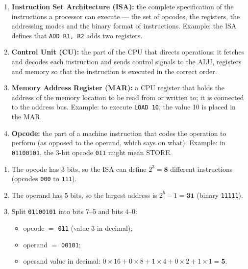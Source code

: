 \documentclass[11pt]{article}
\begin{document}
\begin{corrige}
\begin{enumerate}
\item \textbf{Instruction Set Architecture (ISA):} the complete specification of the instructions a processor can execute — the set of opcodes, the registers, the addressing modes and the binary format of instructions. Example: the ISA defines that \texttt{ADD R1, R2} adds two registers.
\item \textbf{Control Unit (CU):} the part of the CPU that directs operations: it fetches and decodes each instruction and sends control signals to the ALU, registers and memory so that the instruction is executed in the correct order.
\item \textbf{Memory Address Register (MAR):} a CPU register that holds the address of the memory location to be read from or written to; it is connected to the address bus. Example: to execute \texttt{LOAD 10}, the value 10 is placed in the MAR.
\item \textbf{Opcode:} the part of a machine instruction that codes the operation to perform (as opposed to the operand, which says on what). Example: in \texttt{01100101}, the 3-bit opcode \texttt{011} might mean STORE.
\end{enumerate}
\end{corrige}

\begin{corrige}
\begin{enumerate}
\item The opcode has 3 bits, so the ISA can define $2^3 = \textbf{8}$ different instructions (opcodes \texttt{000} to \texttt{111}).
\item The operand has 5 bits, so the largest address is $2^5 - 1 = \textbf{31}$ (binary \texttt{11111}).
\item Split \texttt{01100101} into bits 7--5 and bits 4--0:
\begin{itemize}
\item opcode $=$ \texttt{011} (value 3 in decimal);
\item operand $=$ \texttt{00101};
\item operand value in decimal: $0\times16 + 0\times8 + 1\times4 + 0\times2 + 1\times1 = \textbf{5}$.
\end{itemize}
\end{enumerate}
\end{corrige}
\end{document}
